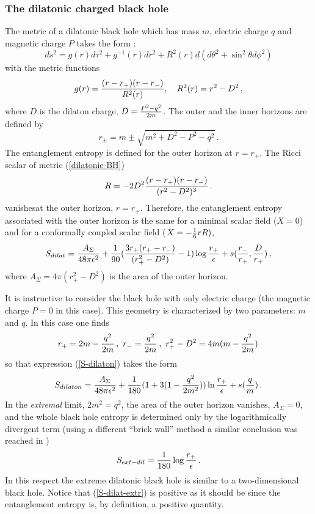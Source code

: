 \documentclass[12pt]{article}
\def\lb{\label}
\def\o{\over}
\begin{document}
\subsubsection{The dilatonic charged black hole}
The metric of a dilatonic black hole which has mass $m$, electric charge $q$ and magnetic charge
$P$ takes the form \cite{Gibbons:1987ps}:
\begin{equation}
ds^2=g(r)d\tau^2+g^{-1}(r)dr^2+R^2(r)d(d\theta^2+\sin^2\theta d\phi^2)
\lb{dilatonic-BH}
\end{equation}
with the metric functions
\begin{equation}
g(r)={(r-r_+)(r-r_-) \over R^2(r)}, \ \ \ R^2(r)=r^2-D^2\, ,
\lb{dilatonic metric}
\end{equation}
where $D$ is the dilaton charge, $D={P^2-q^2 \over 2m}$. The outer and 
the inner
horizons  are defined by
\begin{equation}
r_{\pm}=m\pm \sqrt{m^2+D^2-P^2-q^2}\, .
\end{equation}
The entanglement entropy is defined for the outer horizon at $r=r_+$.
The Ricci scalar of metric (\ref{dilatonic-BH}) 
$$
{R}=-2D^2{(r-r_+)(r-r_-)\o (r^2-D^2)^3}\,.
$$
vanishesat  the outer horizon, $r=r_+$.  Therefore, the entanglement entropy associated with the outer horizon is the same for a minimal scalar field ($X=0$) and for a conformally coupled scalar field ($X=-{1\o 6}r{R})$,
\begin{equation}
S_{dilat}={A_\Sigma \over 48\pi \epsilon^2}+{1 \over 90}
 ({3r_+(r_+-r_-) \over (r^2_+-D^2)}-1)
 \log {r_+\over \epsilon}+s({r_-\over r_+}, {D\o r_+})  \, ,
 \lb{S-dilaton}
\end{equation}
where $A_\Sigma=4\pi(r^2_+-D^2)$ is the area of the outer horizon.

It is instructive to consider the black hole with only electric charge
(the magnetic charge $P=0$ in this case). This geometry is characterized by two parameters: $m$ and $q$. In this case one finds
$$
r_+=2m-{q^2\o 2m}\, , \,\, r_-={q^2\o 2m}\, , \, \, r^2_+-D^2=4m(m-{q^2\o 2m})\, 
$$
so that expression (\ref{S-dilaton}) takes the form
\begin{equation}
S_{dilaton}={A_\Sigma \over 48\pi \epsilon^2}+{1\o 180}(1+3(1-{q^2\o 2m^2}))\ln{r_+\o \epsilon}+s({q\o m})\, .
\lb{S-dilat-P=0}
\end{equation}
In the {\it extremal} limit, $2m^2=q^2$, the area of the outer horizon 
vanishes,
$A_\Sigma=0$, and the whole black hole entropy is determined only by the
logarithmically divergent term   (using a different  ``brick wall'' method a similar conclusion was reached in \cite{Ghosh:1994wb})
\begin{equation}
S_{ext-dil}={1 \over 180} \log {r_+\over \epsilon}\, .
\lb{S-dilat-extr}
\end{equation}
In this respect the extreme dilatonic black hole is similar to a two-dimensional black hole.
Notice that (\ref{S-dilat-extr}) is positive as it should be since the entanglement entropy is, by definition, a positive quantity.
\end{document}
